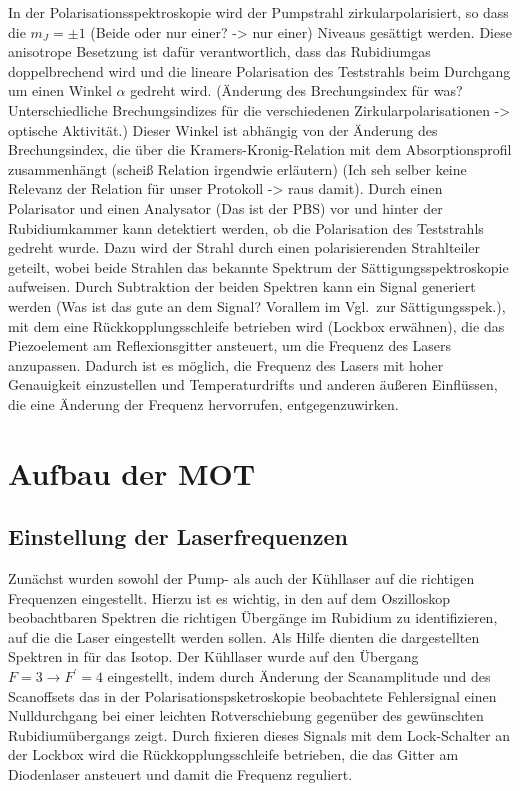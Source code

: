 \documentclass[11pt, a4paper]{article}
\numberwithin{equation}{section}
\newcommand{\korr}[1]{{\color{red}(#1)}}
\begin{document}
In der Polarisationsspektroskopie wird der Pumpstrahl zirkularpolarisiert, so dass die $m_J=\pm1$ \korr{Beide oder nur einer? -> nur einer} Niveaus gesättigt werden.
Diese anisotrope Besetzung ist dafür verantwortlich, dass das Rubidiumgas doppelbrechend wird und die lineare Polarisation des Teststrahls beim Durchgang um einen Winkel $\alpha$ gedreht wird.
\korr{Änderung des Brechungsindex für was? Unterschiedliche Brechungsindizes für die verschiedenen Zirkularpolarisationen -> optische Aktivität.}
Dieser Winkel ist abhängig von der Änderung des Brechungsindex, die über die Kramers-Kronig-Relation mit dem Absorptionsprofil zusammenhängt \korr{scheiß Relation irgendwie erläutern} \korr{Ich seh selber keine Relevanz der Relation für unser Protokoll -> raus damit}.
Durch einen Polarisator und einen Analysator \korr{Das ist der PBS} vor und hinter der Rubidiumkammer kann detektiert werden, ob die Polarisation des Teststrahls gedreht wurde.
Dazu wird der Strahl durch einen polarisierenden Strahlteiler geteilt, wobei beide Strahlen das bekannte Spektrum der Sättigungsspektroskopie aufweisen.
Durch Subtraktion der beiden Spektren kann ein Signal generiert werden \korr{Was ist das gute an dem Signal? Vorallem im Vgl.\ zur Sättigungsspek.}, mit dem eine Rückkopplungsschleife betrieben wird \korr{Lockbox erwähnen}, die das Piezoelement am Reflexionsgitter ansteuert, um die Frequenz des Lasers anzupassen.
Dadurch ist es möglich, die Frequenz des Lasers mit hoher Genauigkeit einzustellen und Temperaturdrifts und anderen äußeren Einflüssen, die eine Änderung der Frequenz hervorrufen, entgegenzuwirken.

\section{Aufbau der MOT}

\subsection{Einstellung der Laserfrequenzen}

Zunächst wurden sowohl der Pump- als auch der Kühllaser auf die richtigen Frequenzen eingestellt.
Hierzu ist es wichtig, in den auf dem Oszilloskop beobachtbaren Spektren die richtigen Übergänge im Rubidium zu identifizieren, auf die die Laser eingestellt werden sollen.
Als Hilfe dienten die dargestellten Spektren in \cite{anleitung} für das  Isotop.
Der Kühllaser wurde auf den Übergang $F=3 \rightarrow F^\prime=4$ eingestellt, indem durch Änderung der Scanamplitude und des Scanoffsets das in der Polarisationspsketroskopie beobachtete Fehlersignal einen Nulldurchgang bei einer leichten Rotverschiebung gegenüber des gewünschten Rubidiumübergangs zeigt.
Durch fixieren dieses Signals mit dem Lock-Schalter an der Lockbox wird die Rückkopplungsschleife betrieben, die das Gitter am Diodenlaser ansteuert und damit die Frequenz reguliert.
\end{document}

